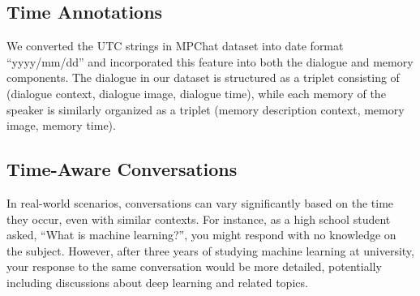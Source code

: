 \subsection{Time Annotations}
\label{section:2.1}

We converted the UTC strings in MPChat dataset into date format ``yyyy/mm/dd'' and incorporated this feature into both the dialogue and memory components. The dialogue in our dataset is structured as a triplet consisting of (dialogue context, dialogue image, dialogue time), while each memory of the speaker is similarly organized as a triplet (memory description context, memory image, memory time).

\subsection{Time-Aware Conversations}
\label{section:2.2}

In real-world scenarios, conversations can vary significantly based on the time they occur, even with similar contexts. For instance, as a high school student asked, ``What is machine learning?'', you might respond with no knowledge on the subject. However, after three years of studying machine learning at university, your response to the same conversation would be more detailed, potentially including discussions about deep learning and related topics.

